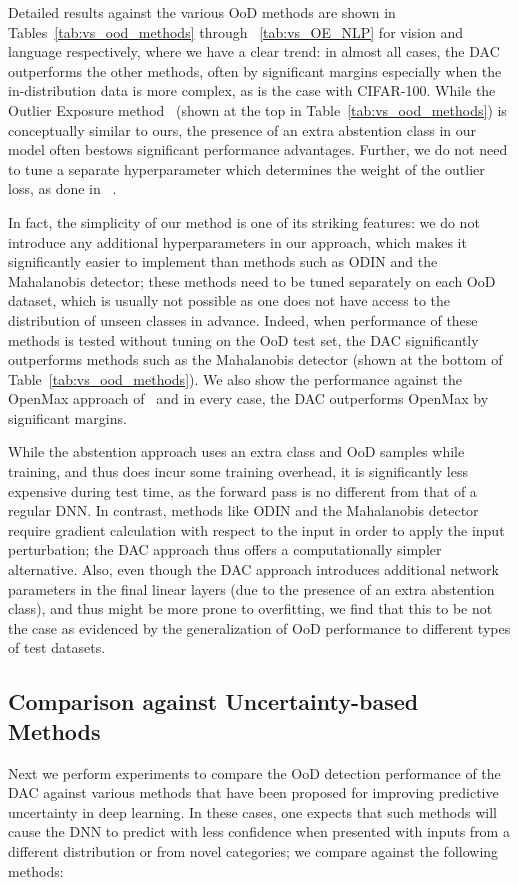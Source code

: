 \documentclass[accepted]{uai2021} \pdfoutput=1
\begin{document}
Detailed results against the various OoD methods are shown in Tables~\ref{tab:vs_ood_methods} through ~\ref{tab:vs_OE_NLP} for vision and language respectively, where we have a clear trend: in almost all cases, the DAC outperforms the other methods, often by significant margins especially when the in-distribution data is more complex, as is the case with CIFAR-100. While the Outlier Exposure method~\cite{hendrycks2018deep} (shown at  the top in Table~\ref{tab:vs_ood_methods}) is conceptually similar to ours, the presence of an extra abstention class in our model often bestows significant performance advantages. Further, we do not need to tune a separate hyperparameter which determines the weight of the outlier loss, as done in ~\cite{hendrycks2018deep}.

In fact, the simplicity of our method is one of its striking features: we do not introduce any additional hyperparameters in our approach, which makes it significantly easier to implement than methods such as ODIN and the Mahalanobis detector; these methods  need to be tuned separately on each OoD dataset, which is usually not possible as one does not have access to the distribution of unseen classes in advance. Indeed, when performance of these methods is tested without tuning on the OoD test set, the DAC significantly outperforms methods such as the Mahalanobis detector (shown at the bottom of  Table~\ref{tab:vs_ood_methods}).   We also show the performance against the OpenMax approach of~\cite{bendale2016towards} and in every case, the DAC outperforms OpenMax by significant margins. 

While the abstention approach uses an extra class and OoD samples while training, and thus does incur some training overhead, it is significantly less expensive during test time, as the forward pass is  no different from that of a regular DNN. In contrast, methods like ODIN and the Mahalanobis detector require gradient calculation with respect to the input in order to apply the  input perturbation; the DAC approach thus offers a computationally simpler alternative.  Also, even though the DAC approach introduces additional network parameters in the final linear layers (due to the presence of an extra abstention class), and thus might be more prone to overfitting, we find that this to be not the case as evidenced by the generalization of OoD performance to different types of test datasets.

\subsection{Comparison against Uncertainty-based Methods}
Next we perform experiments to compare the OoD detection performance of the DAC against various methods that have been proposed for improving predictive uncertainty in deep learning. In these cases, one expects that such methods will cause the DNN to predict with less confidence when presented with inputs from a different distribution or from novel categories; we compare against the following methods:
\end{document}
